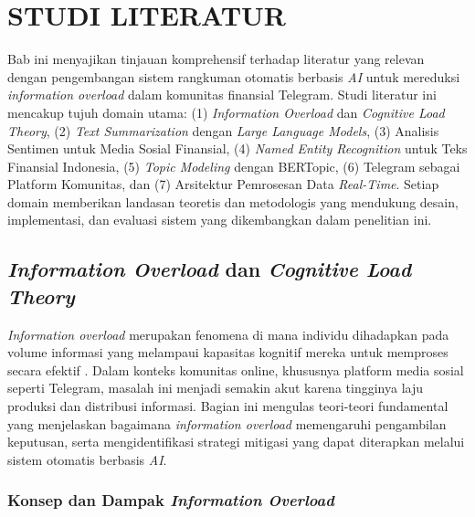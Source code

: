 \chapter{STUDI LITERATUR}
\label{chap:studi-literatur}

Bab ini menyajikan tinjauan komprehensif terhadap literatur yang relevan dengan pengembangan sistem rangkuman otomatis berbasis \textit{AI} untuk mereduksi \textit{information overload} dalam komunitas finansial Telegram. Studi literatur ini mencakup tujuh domain utama: (1) \textit{Information Overload} dan \textit{Cognitive Load Theory}, (2) \textit{Text Summarization} dengan \textit{Large Language Models}, (3) Analisis Sentimen untuk Media Sosial Finansial, (4) \textit{Named Entity Recognition} untuk Teks Finansial Indonesia, (5) \textit{Topic Modeling} dengan BERTopic, (6) Telegram sebagai Platform Komunitas, dan (7) Arsitektur Pemrosesan Data \textit{Real-Time}. Setiap domain memberikan landasan teoretis dan metodologis yang mendukung desain, implementasi, dan evaluasi sistem yang dikembangkan dalam penelitian ini.

\section{\textit{Information Overload} dan \textit{Cognitive Load Theory}}
\label{sec:information-overload}

\textit{Information overload} merupakan fenomena di mana individu dihadapkan pada volume informasi yang melampaui kapasitas kognitif mereka untuk memproses secara efektif \autocite{eppler2004}. Dalam konteks komunitas online, khususnya platform media sosial seperti Telegram, masalah ini menjadi semakin akut karena tingginya laju produksi dan distribusi informasi. Bagian ini mengulas teori-teori fundamental yang menjelaskan bagaimana \textit{information overload} memengaruhi pengambilan keputusan, serta mengidentifikasi strategi mitigasi yang dapat diterapkan melalui sistem otomatis berbasis \textit{AI}.

\subsection{Konsep dan Dampak \textit{Information Overload}}

